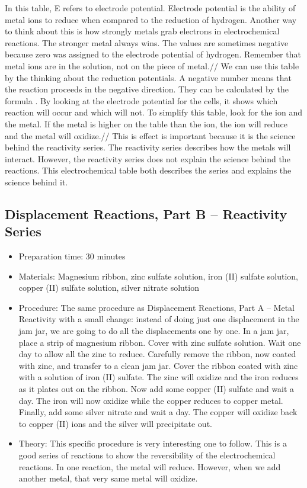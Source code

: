 \begin{itemize}
{In this table, E refers to electrode potential. Electrode potential is the ability of metal ions to reduce when compared to the reduction of hydrogen. Another way to think about this is how strongly metals grab electrons in electrochemical reactions. The stronger metal always wins. The values are sometimes negative because zero was assigned to the electrode potential of hydrogen. Remember that metal ions are in the solution, not on the piece of metal.//
We can use this table by the thinking about the reduction potentials. A negative number means that the reaction proceeds in the negative direction. They can be calculated by the formula . By looking at the electrode potential for the cells, it shows which reaction will occur and which will not. To simplify this table, look for the ion and the metal. If the metal is higher on the table than the ion, the ion will reduce and the metal will oxidize.//
This is effect is important because it is the science behind the reactivity series. The reactivity series describes how the metals will interact. However, the reactivity series does not explain the science behind the reactions. This electrochemical table both describes the series and explains the science behind it.}
\end{itemize}

\subsection{Displacement Reactions, Part B – Reactivity Series}
\begin{itemize}
\item{Preparation time: 30 minutes}
\item{Materials: Magnesium ribbon, zinc sulfate solution, iron (II) sulfate solution, copper (II) sulfate solution, silver nitrate solution}
\item{Procedure: The same procedure as Displacement Reactions, Part A – Metal Reactivity with a small change: instead of doing just one displacement in the jam jar, we are going to do all the displacements one by one. In a jam jar, place a strip of magnesium ribbon. Cover with zinc sulfate solution. Wait one day to allow all the zinc to reduce. Carefully remove the ribbon, now coated with zinc, and transfer to a clean jam jar. Cover the ribbon coated with zinc with a solution of iron (II) sulfate. The zinc will oxidize and the iron reduces as it plates out on the ribbon. Now add some copper (II) sulfate and wait a day. The iron will now oxidize while the copper reduces to copper metal. Finally, add some silver nitrate and wait a day. The copper will oxidize back to copper (II) ions and the silver will precipitate out.}
\item{Theory: This specific procedure is very interesting one to follow. This is a good series of reactions to show the reversibility of the electrochemical reactions. In one reaction, the metal will reduce. However, when we add another metal, that very same metal will oxidize.}
\end{itemize}

